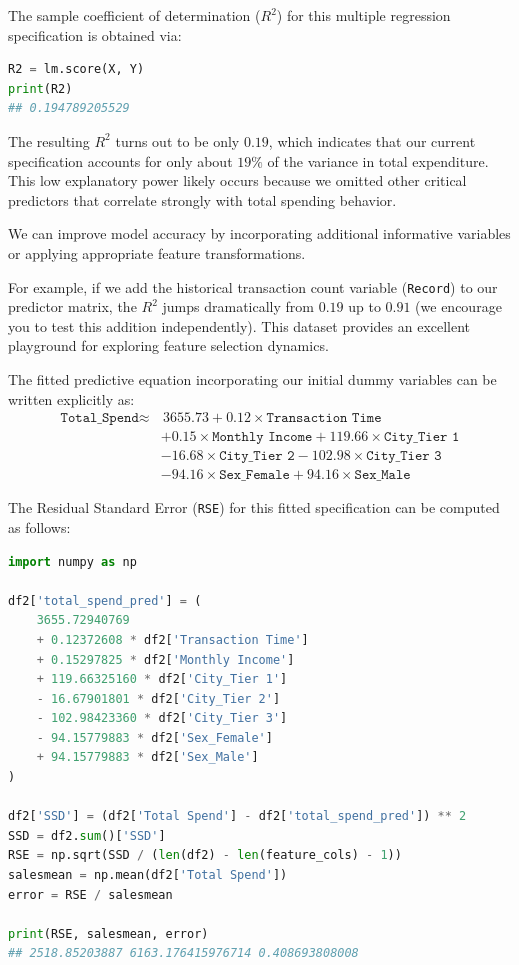The sample coefficient of determination ($R^2$) for this multiple regression specification is obtained via:
\begin{lstlisting}[language=Python]
R2 = lm.score(X, Y)
print(R2)
## 0.194789205529
\end{lstlisting}

The resulting $R^2$ turns out to be only $0.19$, which indicates that our current specification accounts for only about $19\%$ of the variance in total expenditure. This low explanatory power likely occurs because we omitted other critical predictors that correlate strongly with total spending behavior.

We can improve model accuracy by incorporating additional informative variables or applying appropriate feature transformations.

For example, if we add the historical transaction count variable (\texttt{Record}) to our predictor matrix, the $R^2$ jumps dramatically from $0.19$ up to $0.91$ (we encourage you to test this addition independently). This dataset provides an excellent playground for exploring feature selection dynamics.

The fitted predictive equation incorporating our initial dummy variables can be written explicitly as:
\begin{align}
	\texttt{Total\_Spend} \approx & \, 3655.73 + 0.12 \times \texttt{Transaction Time} \nonumber \\
	& + 0.15 \times \texttt{Monthly Income} + 119.66 \times \texttt{City\_Tier 1} \nonumber \\
	& - 16.68 \times \texttt{City\_Tier 2} - 102.98 \times \texttt{City\_Tier 3} \nonumber \\
	& - 94.16 \times \texttt{Sex\_Female} + 94.16 \times \texttt{Sex\_Male}
\end{align}

The Residual Standard Error (\texttt{RSE}) for this fitted specification can be computed as follows:

\begin{lstlisting}[language=Python]
import numpy as np

df2['total_spend_pred'] = (
    3655.72940769
    + 0.12372608 * df2['Transaction Time']
    + 0.15297825 * df2['Monthly Income']
    + 119.66325160 * df2['City_Tier 1']
    - 16.67901801 * df2['City_Tier 2']
    - 102.98423360 * df2['City_Tier 3']
    - 94.15779883 * df2['Sex_Female']
    + 94.15779883 * df2['Sex_Male']
)

df2['SSD'] = (df2['Total Spend'] - df2['total_spend_pred']) ** 2
SSD = df2.sum()['SSD']
RSE = np.sqrt(SSD / (len(df2) - len(feature_cols) - 1))
salesmean = np.mean(df2['Total Spend'])
error = RSE / salesmean

print(RSE, salesmean, error)
## 2518.85203887 6163.176415976714 0.408693808008
\end{lstlisting}

